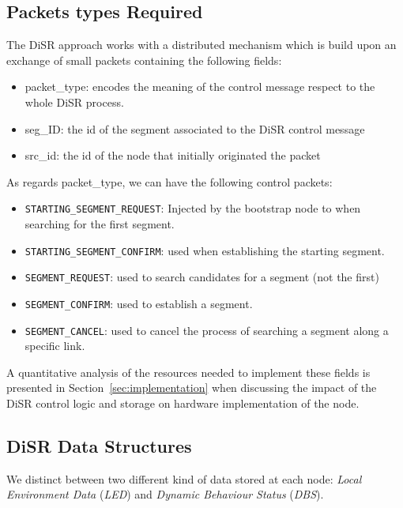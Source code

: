 
\subsection{Packets types Required}

The DiSR approach works with a distributed mechanism which is build
upon an exchange of small packets containing the following fields:
\begin{itemize}
\item{packet\_type}: encodes the meaning of the control message respect
to the whole DiSR process.
\item{seg\_ID}: the id of the segment associated to the DiSR control message
\item{src\_id}: the id of the node that initially originated the
packet
\end{itemize}

As regards packet\_type, we can have the following control packets:
\begin{itemize}
\item{\texttt{STARTING\_SEGMENT\_REQUEST}}: Injected by the bootstrap
node to when searching for the first segment. 
\item{\texttt{STARTING\_SEGMENT\_CONFIRM}}: used when establishing
the starting  segment. 
\item{\texttt{SEGMENT\_REQUEST}}: used to search candidates for a segment (not the
first)
\item{\texttt{SEGMENT\_CONFIRM}}: used to establish a segment. 
\item{\texttt{SEGMENT\_CANCEL}}: used to cancel the process of searching a segment along a
specific link.
\end{itemize}

A quantitative analysis of the resources needed to implement these
fields is presented in Section~\ref{sec:implementation} when
discussing the impact of the DiSR control logic and storage on
hardware implementation of the node.

\subsection{DiSR Data Structures}
\label{ssec:disr_dstruct}

We distinct between two different kind of data stored at each node:
\emph{Local Environment Data} (\emph{LED}) and \emph{Dynamic Behaviour
Status} (\emph{DBS}).

